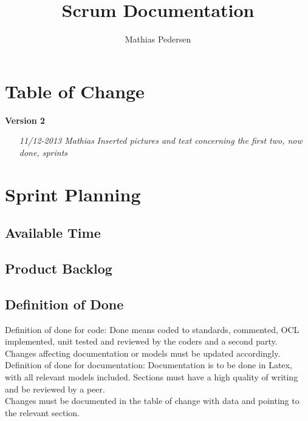 \documentclass[]{report}
\title{Scrum Documentation}
\author{Mathias Pedersen}
\begin{document}
\maketitle

\chapter*{Table of Change}

\hspace{-2cm}\textbf{Version 2}
 \begin{itemize}
\item[\textit{11/12-2013 Mathias}] \hspace{0.5cm}
\textit{Inserted pictures and text concerning the first two, now done, sprints}


\vspace{0.4cm}

\end{itemize}



\chapter*{Sprint Planning}



\section{Available Time}
\label{sec:Available Time}


\section{Product Backlog}
\label{sec:Product Backlog}



\section{Definition of Done}
\label{sec:Definition of Done}
Definition of done for code:
Done means coded to standards, commented, OCL implemented, unit tested and reviewed by the coders and a second party. Changes affecting documentation or models must be updated accordingly. \\


\noindent Definition of done for documentation:
Documentation is to be done in Latex, with all relevant models included. Sections must have a high quality of writing and be reviewed by a peer. \\
Changes must be documented in the table of change with data and pointing to the relevant section.
\end{document}
